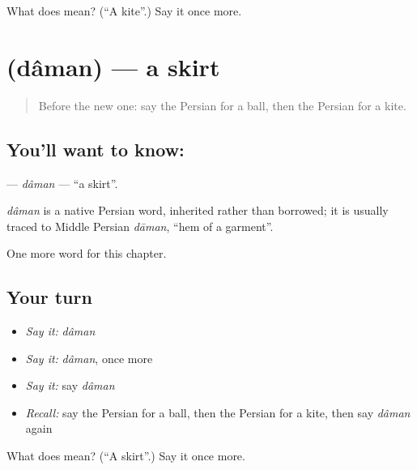 \begin{tcolorbox}[breakable,colback=teal!4,colframe=teal!35!black,title={Before you move on}]
What does  mean? (\textquotedblleft{}A kite\textquotedblright{}.) Say it once more.
\end{tcolorbox}
\section[\texorpdfstring{\fa{دامن} (dâman)}{دامن (dâman)}]{ (dâman) — a skirt}

\label{lesson:FA-C96-daman}



\begin{quote}
Before the new one: say the Persian for a ball, then the Persian for a kite.
\end{quote}

\subsection*{You'll want to know: }
\textbf{} — \emph{dâman} — \textquotedblleft{}a skirt\textquotedblright{}.

\begin{cousinweb}
\emph{dâman} is a native Persian word, inherited rather than borrowed; it is usually traced to Middle Persian \emph{dāman}, \textquotedblleft{}hem of a garment\textquotedblright{}.
\end{cousinweb}

\begin{grammarlens}[title={What you've built}]
One more word for this chapter.
\end{grammarlens}

\subsection*{Your turn}
\begin{itemize}
\raggedright
  \item \emph{Say it:} \emph{dâman}
  \item \emph{Say it:} \emph{dâman}, once more
  \item \emph{Say it:} say \emph{dâman}
  \item \emph{Recall:} say the Persian for a ball, then the Persian for a kite, then say \emph{dâman} again
\end{itemize}

\begin{tcolorbox}[breakable,colback=teal!4,colframe=teal!35!black,title={Before you move on}]
What does  mean? (\textquotedblleft{}A skirt\textquotedblright{}.) Say it once more.
\end{tcolorbox}
